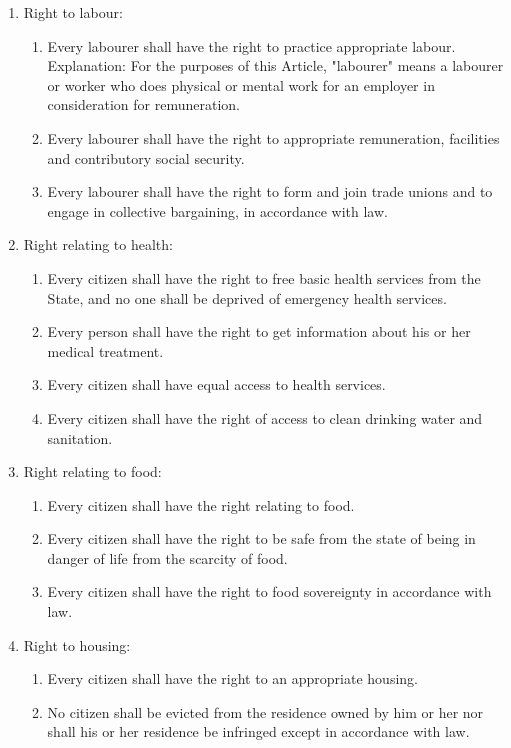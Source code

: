 \begin{questions}
\begin{solution}
\begin{enumerate}
\item Right to labour:
\begin{enumerate}
    \item Every labourer shall have the right to practice appropriate labour. Explanation: For the purposes of this Article, "labourer" means a labourer or worker who does physical or mental work for an employer in consideration for remuneration.
    \item Every labourer shall have the right to appropriate remuneration, facilities and contributory social security.
    \item Every labourer shall have the right to form and join trade unions and to engage in collective bargaining, in accordance with law.
\end{enumerate}

\item Right relating to health:
\begin{enumerate}
    \item Every citizen shall have the right to free basic health services from the State, and no one shall be deprived of emergency health services.
    \item Every person shall have the right to get information about his or her medical treatment.
    \item Every citizen shall have equal access to health services.
    \item Every citizen shall have the right of access to clean drinking water and sanitation.
\end{enumerate}

\item Right relating to food:
\begin{enumerate}
    \item Every citizen shall have the right relating to food.
    \item Every citizen shall have the right to be safe from the state of being in danger of life from the scarcity of food.
    \item Every citizen shall have the right to food sovereignty in accordance with law.
\end{enumerate}

\item Right to housing:
\begin{enumerate}
    \item Every citizen shall have the right to an appropriate housing.
    \item No citizen shall be evicted from the residence owned by him or her nor shall his or her residence be infringed except in accordance with law.
\end{enumerate}


\end{enumerate}
\end{solution}
\end{questions}
